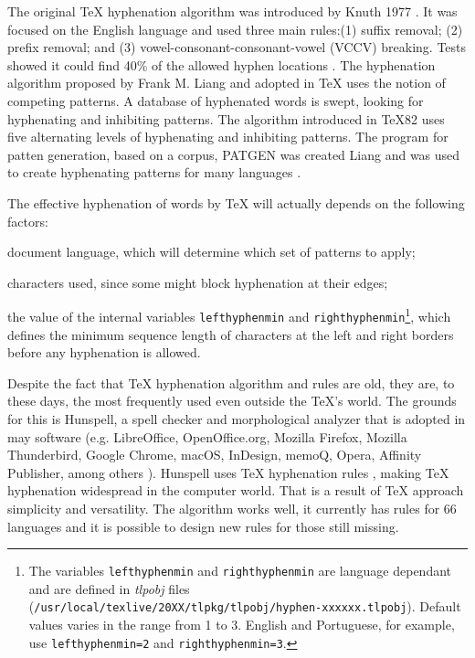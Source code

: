 \documentclass{article}
\begin{document}
The original \TeX{} hyphenation algorithm was introduced by Knuth 1977
\cite{knuth1977}. It was focused on the English language and used three main
rules:(1) suffix removal; (2) prefix removal; and (3)
vowel-consonant-consonant-vowel (VCCV) breaking. Tests showed it could find
40\% of the allowed hyphen locations \cite{liang1983}. The hyphenation
algorithm proposed by Frank M. Liang and adopted in \TeX{} uses the notion of
competing patterns. A database of hyphenated words is swept, looking for
hyphenating and inhibiting patterns. The algorithm introduced in \TeX{}82 uses
five alternating levels of hyphenating and inhibiting patterns. The program
for patten generation, based on a corpus, PATGEN was created Liang
\cite{liangbreitenlohner1999} and was used to create hyphenating patterns for
many languages
\cite{sojka1995,sojka1995a,sojka2005thesis,sojka2003,scannell2003}.

The effective hyphenation of words by \TeX{} will actually depends on the following factors:
\begin{enumerate*}[label=\arabic*)]
    \item document language, which will determine which set of patterns to apply;
    \item characters used, since some might block hyphenation at their edges;
    \item the value of the internal variables \verb|lefthyphenmin| and \verb|righthyphenmin|\footnote{
	The variables \verb|lefthyphenmin| and \verb|righthyphenmin| are language dependant and
	are defined in \emph{tlpobj} files (\verb|/usr/local/texlive/20XX/tlpkg/tlpobj/hyphen-xxxxxx.tlpobj|). 
	Default values varies in the range from 1 to 3. 
    	English and Portuguese, for example, use \verb|lefthyphenmin=2| and \verb|righthyphenmin=3|.},
        which defines the minimum sequence length of characters at the left and right borders
        before any hyphenation is allowed.
\end{enumerate*}

Despite the fact that \TeX{} hyphenation algorithm and rules are old, they are,
to these days, the most frequently used even outside the \TeX{}'s world. The
grounds for this is Hunspell, a spell checker and morphological analyzer that
is adopted in may software (e.g. LibreOffice, OpenOffice.org, Mozilla Firefox,
Mozilla Thunderbird, Google Chrome, macOS, InDesign, memoQ, Opera, Affinity
Publisher, among others \cite{hunspell}). Hunspell uses \TeX{} hyphenation
rules \cite{hunspellhyphen,levien1998}, making \TeX{} hyphenation widespread in
the computer world. That is a result of \TeX{} approach simplicity and
versatility.  The algorithm works well, it currently has rules for 66 languages
\cite{texhyphenrules} and it is possible to design new rules for those still
missing.
\end{document}
